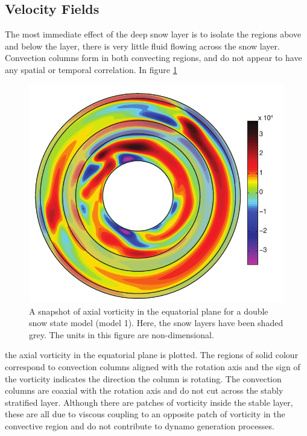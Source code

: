 \subsection{Velocity Fields}
The most immediate effect of the deep snow layer is to isolate the regions above and below the layer, there is very little fluid flowing across the snow layer. Convection columns form in both convecting regions, and do not appear to have any spatial or temporal correlation. In figure \ref{fig:vorticity}
\begin{figure}
	\centering
	\noindent\includegraphics[width=.6\linewidth]{Chapter4/figures/wz19_043_2500_00.pdf}
	\caption{A snapshot of axial vorticity in the equatorial plane for a double snow state model (model 1). Here, the snow layers have been shaded grey. The units in this figure are non-dimensional.}
	\label{fig:vorticity}
\end{figure}
the axial vorticity in the equatorial plane is plotted. The regions of solid colour correspond to convection columns aligned with the rotation axis and the sign of the vorticity indicates the direction the column is rotating. The convection columns are coaxial with the rotation axis and do not cut across the stably stratified layer. Although there are patches of vorticity inside the stable layer, these are all due to viscous coupling to an opposite patch of vorticity in the convective region and do not contribute to dynamo generation processes.

